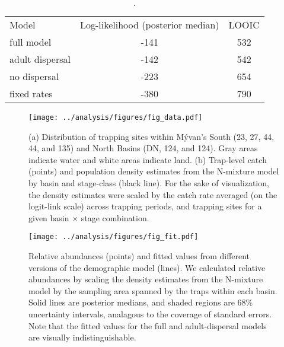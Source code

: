 \documentclass[11pt]{article}
\begin{document}

\clearpage



\clearpage
\begin{table}
\caption{\label{tab:compare}
.
}
\setlength{\tabcolsep}{12pt}
\begin{tabular}{lcc}
\toprule
Model                  &    Log-likelihood (posterior median) & LOOIC \\
\cmidrule{1-3}
full model             & -141 & 532 \\
adult dispersal        & -142 & 542 \\
no dispersal           & -223 & 654 \\
fixed rates            & -380 & 790 \\
\bottomrule
\end{tabular}
\end{table}
\clearpage

\clearpage
\begin{figure}
\centering
\texttt{[image: ../analysis/figures/fig\_data.pdf]}
\caption{\label{fig:data}
(a) Distribution of trapping sites within M\'{y}van's
South (23, 27, 44, 44, and 135) and North Basins (DN, 124, and 124). 
Gray areas indicate water and white areas indicate land.
(b) Trap-level catch (points) and 
population density estimates from the N-mixture model by basin and stage-class (black line).
For the sake of visualization, the density estimates were scaled 
by the catch rate averaged (on the logit-link scale) across trapping periods,
and trapping sites for a given basin $\times$ stage combination.
}
\end{figure}
\clearpage

\clearpage
\begin{figure}
\centering
\texttt{[image: ../analysis/figures/fig\_fit.pdf]}
\caption{\label{fig:fit}
Relative abundances (points) and fitted values from different versions 
of the demographic model (lines).
We calculated relative abundances by scaling the density estimates from the 
N-mixture model by the sampling area spanned by the traps within each basin. 
Solid lines are posterior medians,
and shaded regions are 68\% uncertainty intervals, 
analagous to the coverage of standard errors.
Note that the fitted values for the full and adult-dispersal models 
are visually indistinguishable.
}
\end{figure}
\clearpage
\end{document}
